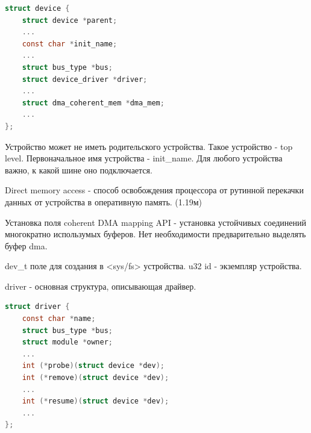 \documentclass[12pt,a4paper]{scrreprt}
\begin{document}
\begin{lstlisting}[language=C]
struct device {
	struct device *parent;
	...
	const char *init_name;
	...
	struct bus_type *bus;
	struct device_driver *driver;
	...
	struct dma_coherent_mem *dma_mem;
	...
};
\end{lstlisting}

Устройство может не иметь родительского устройства. Такое устройство - top level. Первоначальное имя устройства - init\_name. Для любого устройства важно, к какой шине оно подключается.

Direct memory access - способ освобождения процессора от рутинной перекачки данных от устройства в оперативную память. (1.19м)

Установка поля coherent DMA mapping API - установка устойчивых соединений многократно использумых буферов. Нет необходимости предварительно выделять буфер dma.

dev\_t поле для создания в <sys/fs> устройства. u32 id - экземпляр устройства.

driver - основная структура, описывающая драйвер.

\begin{lstlisting}[language=C]
struct driver {
	const char *name;
	struct bus_type *bus;
	struct module *owner;
	...
	int (*probe)(struct device *dev);
	int (*remove)(struct device *dev);
	...
	int (*resume)(struct device *dev);
	...
};
\end{lstlisting}
\end{document}
